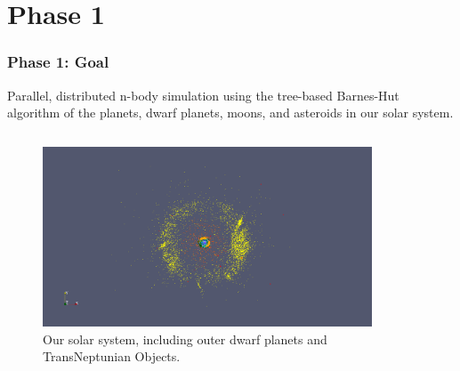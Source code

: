 \section*{Phase 1}
\begin{frame}
	\frametitle{Phase 1: Goal}
  \vspace*{-1em}
	\begin{center}
	    Parallel, distributed n-body simulation using the tree-based Barnes-Hut algorithm of the planets, dwarf planets, moons, and asteroids in our solar system.
	\end{center}
	\vspace*{-0.75em}
	\begin{columns}
	    \begin{column}{.45\linewidth}
	        \begin{figure}
	            \centering
	            \captionsetup{justification=centering}
	            \includegraphics[width=\columnwidth]{figures/all_bodies_whole_system}
	            \caption{\setfontsize{10pt}Our solar system, including outer dwarf planets and TransNeptunian Objects.}
	        \end{figure}
	    \end{column}
	    \hspace*{2em}
	    \begin{column}{.45\linewidth}
	        \begin{figure}
	            \centering
	            \captionsetup{justification=centering}

\end{figure}
\end{column}
\end{columns}
\end{frame}
